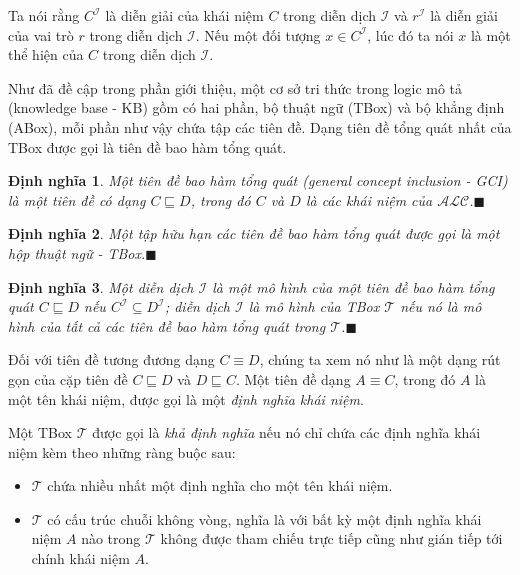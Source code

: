\documentclass[12pt,a4paper]{report}
\newtheorem{Definition}{Định nghĩa}[chapter]
\newcommand{\myend}{\mbox{}\hfill\mbox{{\scriptsize$\!\blacksquare$}}}
\newcommand{\ALC}{$\mathcal{ALC}$}
\newcommand{\mT}{\mathcal{T}}
\newcommand{\mI}{\mathcal{I}}
\begin{document}
Ta nói rằng $C^\mI$ là diễn giải của khái niệm $C$ trong diễn dịch $\mathcal{I}$ và $r^\mI$ là diễn giải của vai trò $r$ trong diễn dịch $\mI$. Nếu một đối tượng $x \in C^\mI$, lúc đó ta nói $x$ là một thể hiện của $C$ trong diễn dịch $\mI$.

Như đã đề cập trong phần giới thiệu, một cơ sở tri thức trong logic mô tả (knowledge base - KB) gồm có hai phần, bộ thuật ngữ (TBox) và bộ khẳng định (ABox), mỗi phần như vậy chứa tập các tiên đề. Dạng tiên đề tổng quát nhất của TBox được gọi là tiên đề bao hàm tổng quát.

\begin{Definition}\label{def:GCI}
Một \textnormal{tiên đề bao hàm tổng quát} (general concept inclusion - GCI) là một tiên đề có dạng $C \sqsubseteq D$, trong đó $C$ và $D$ là các khái niệm của \ALC.\myend
\end{Definition}

\begin{Definition}\label{def:TBox}
Một tập hữu hạn các tiên đề bao hàm tổng quát được gọi là một \textnormal{hộp thuật ngữ - TBox}.\myend
\end{Definition}

\begin{Definition}\label{def:ModelTBox}
 Một diễn dịch $\mI$ là một \textnormal{mô hình} của một tiên đề bao hàm tổng quát $C \sqsubseteq D$ nếu $C^\mI \subseteq D^\mI$; diễn dịch $\mI$ là mô hình của TBox $\mT$ nếu nó là mô hình của tất cả các tiên đề bao hàm tổng quát trong $\mT$.\myend
\end{Definition}

Đối với tiên đề tương đương dạng $C \equiv D$, chúng ta xem nó như là một dạng rút gọn của cặp tiên đề $C \sqsubseteq D$ và $D \sqsubseteq C$. Một tiên đề dạng $A \equiv C$, trong đó $A$ là một tên khái niệm, được gọi là một \textit{định nghĩa khái niệm}. 

Một TBox $\mathcal{T}$ được gọi là \textit{khả định nghĩa} nếu nó chỉ chứa các định nghĩa khái niệm kèm theo những ràng buộc sau:
\begin{itemize}
  \item $\mT$ chứa nhiều nhất một định nghĩa cho một tên khái niệm.
  
  \item $\mT$ có cấu trúc chuỗi không vòng, nghĩa là với bất kỳ một định nghĩa khái niệm $A$ nào trong $\mT$ không được tham chiếu trực tiếp cũng như gián tiếp tới chính khái niệm $A$.
\end{itemize}
\end{document}
